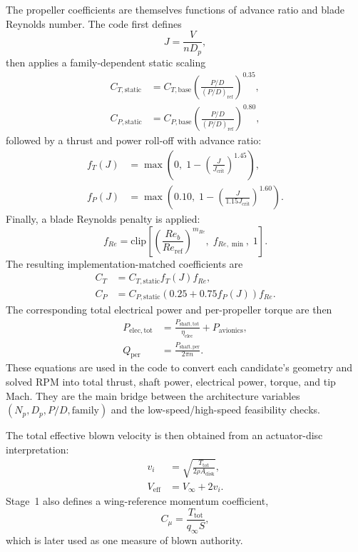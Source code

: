 \documentclass[conf]{new-aiaa}
\begin{document}
The propeller coefficients are themselves functions of advance ratio and blade Reynolds number. The code first defines
\begin{equation}
J = \frac{V}{n D_p},
\end{equation}
then applies a family-dependent static scaling
\begin{align}
C_{T,\mathrm{static}} &= C_{T,\mathrm{base}}
\left(\frac{P/D}{(P/D)_{\mathrm{ref}}}\right)^{0.35}, \\
C_{P,\mathrm{static}} &= C_{P,\mathrm{base}}
\left(\frac{P/D}{(P/D)_{\mathrm{ref}}}\right)^{0.80},
\end{align}
followed by a thrust and power roll-off with advance ratio:
\begin{align}
f_T(J) &= \max\!\left(0,\; 1 - \left(\frac{J}{J_{\mathrm{crit}}}\right)^{1.45}\right), \\
f_P(J) &= \max\!\left(0.10,\; 1 - \left(\frac{J}{1.15J_{\mathrm{crit}}}\right)^{1.60}\right).
\end{align}
Finally, a blade Reynolds penalty is applied:
\begin{equation}
f_{Re} = \mathrm{clip}\!\left[\left(\frac{Re_b}{Re_{\mathrm{ref}}}\right)^{m_{Re}},\;
f_{Re,\min},\; 1\right].
\end{equation}
The resulting implementation-matched coefficients are
\begin{align}
C_T &= C_{T,\mathrm{static}} f_T(J) f_{Re}, \\
C_P &= C_{P,\mathrm{static}} \left(0.25 + 0.75 f_P(J)\right) f_{Re}.
\end{align}
The corresponding total electrical power and per-propeller torque are then
\begin{align}
P_{\mathrm{elec,tot}} &= \frac{P_{\mathrm{shaft,tot}}}{\eta_{\mathrm{elec}}} + P_{\mathrm{avionics}}, \\
Q_{\mathrm{per}} &= \frac{P_{\mathrm{shaft,per}}}{2\pi n}.
\end{align}
These equations are used in the code to convert each candidate's geometry and solved RPM into total thrust, shaft power, electrical power, torque, and tip Mach. They are the main bridge between the architecture variables \((N_p,D_p,P/D,\text{family})\) and the low-speed/high-speed feasibility checks.

The total effective blown velocity is then obtained from an actuator-disc interpretation:
\begin{align}
v_i &= \sqrt{\frac{T_{\mathrm{tot}}}{2\rho A_{\mathrm{disk}}}}, \\
V_{\mathrm{eff}} &= V_\infty + 2v_i.
\end{align}
Stage~1 also defines a wing-reference momentum coefficient,
\begin{equation}
C_\mu = \frac{T_{\mathrm{tot}}}{q_\infty S},
\end{equation}
which is later used as one measure of blown authority.
\end{document}
